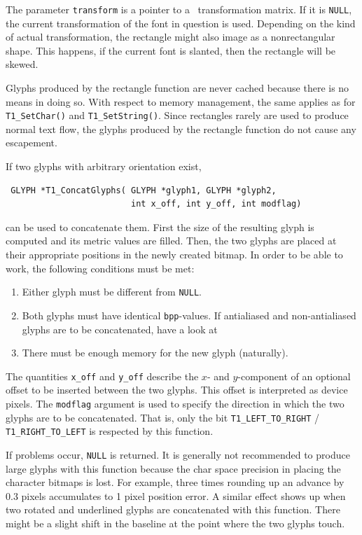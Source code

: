 The parameter \verb+transform+ is a pointer to a \tonelib\ transformation
matrix. If it is \verb+NULL+, the current transformation of the font in
question is used. Depending on the kind of actual transformation, the
rectangle might also image as a nonrectangular shape. This happens, if the
current font is slanted, then the rectangle will be skewed.

Glyphs produced by the rectangle function are never cached because there is
no means in doing so. With respect to memory management, the same applies as
for \verb+T1_SetChar()+ and \verb+T1_SetString()+. Since rectangles rarely are
used to produce normal text flow, the glyphs produced by the rectangle
function do not cause any escapement.


If two glyphs with arbitrary orientation exist,
\precorr
\begin{verbatim}
 GLYPH *T1_ConcatGlyphs( GLYPH *glyph1, GLYPH *glyph2,
                         int x_off, int y_off, int modflag)
\end{verbatim}\postcorr
can be used to concatenate them. First the size of the resulting glyph is
computed and its metric values are filled. Then, the two glyphs are placed at
their appropriate positions in the newly created bitmap. In order to be able
to work, the following conditions must be met:
\begin{enumerate}
\item Either glyph must be different from \verb+NULL+.
\item Both glyphs must have identical \verb+bpp+-values. If antialiased and
  non-antialiased glyphs are to be concatenated, have a look at
\item There must be enough memory for the new glyph (naturally).
\end{enumerate}
The quantities \verb+x_off+ and \verb+y_off+ describe the $x$- and
$y$-component of an optional offset to be inserted between the two
glyphs. This offset is interpreted as device pixels. The \verb+modflag+
argument is used to specify the direction in which the two glyphs are to be
concatenated. That is, only the bit \verb+T1_LEFT_TO_RIGHT+ /
\verb+T1_RIGHT_TO_LEFT+ is respected by this function.

If problems occur, \verb+NULL+ is returned.
It is generally not recommended to produce large glyphs with this function
because the char space precision in placing the character bitmaps is lost. For
example, three times rounding up an advance by 0.3 pixels accumulates to 1
pixel position error. A similar effect shows up when two rotated and underlined
glyphs are concatenated with this function. There might be a slight shift in the
baseline at the point where the two glyphs touch.

